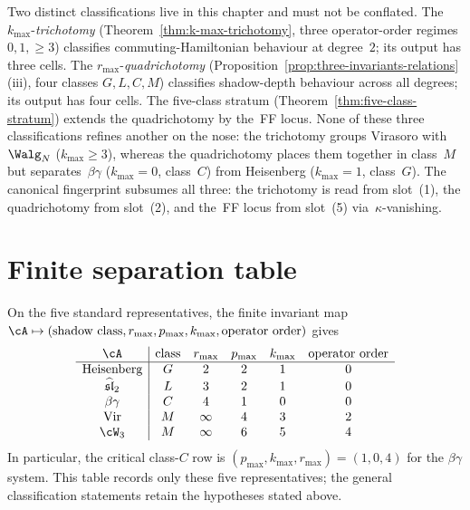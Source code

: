 \begin{remark}
\label{rem:trichotomy-vs-quadrichotomy}
Two distinct classifications live in this chapter and must not be
conflated. The $k_{\max}$-\emph{trichotomy}
\textup{(}Theorem~\textup{\ref{thm:k-max-trichotomy}}, three
operator-order regimes $0, 1, \geq 3$\textup{)} classifies
commuting-Hamiltonian behaviour at degree~$2$; its output has three
cells. The $r_{\max}$-\emph{quadrichotomy}
\textup{(}Proposition~\textup{\ref{prop:three-invariants-relations}}(iii),
four classes $G, L, C, M$\textup{)} classifies shadow-depth behaviour
across all degrees; its output has four cells. The five-class stratum
\textup{(}Theorem~\textup{\ref{thm:five-class-stratum}}\textup{)}
extends the quadrichotomy by the~FF locus. None of these three
classifications refines another on the nose: the trichotomy groups
Virasoro with~$\Walg_N$ ($k_{\max} \geq 3$), whereas the quadrichotomy
places them together in class~$M$ but separates~$\beta\gamma$
($k_{\max} = 0$, class~$C$) from Heisenberg ($k_{\max} = 1$, class~$G$).
The canonical fingerprint subsumes all three: the trichotomy is read
from slot~(1), the quadrichotomy from slot~(2), and the~FF locus from
slot~(5) via~$\kappa$-vanishing.
\end{remark}

\section{Finite separation table}
\label{sec:three-invariants-compute}

On the five standard representatives, the finite invariant map
$\cA\mapsto(\text{shadow class},r_{\max},p_{\max},k_{\max},
\text{operator order})$ gives
\[
\begin{array}{c|ccccc}
\cA&\text{class}&r_{\max}&p_{\max}&k_{\max}&\text{operator order}\\ \hline
\text{Heisenberg}&G&2&2&1&0\\
\widehat{\mathfrak{sl}}_2&L&3&2&1&0\\
\beta\gamma&C&4&1&0&0\\
\mathrm{Vir}&M&\infty&4&3&2\\
\cW_3&M&\infty&6&5&4
\end{array}
\]
In particular, the critical class-$C$ row is
$(p_{\max},k_{\max},r_{\max})=(1,0,4)$ for the $\beta\gamma$
system.  This table records only these five representatives; the
general classification statements retain the hypotheses stated above.
